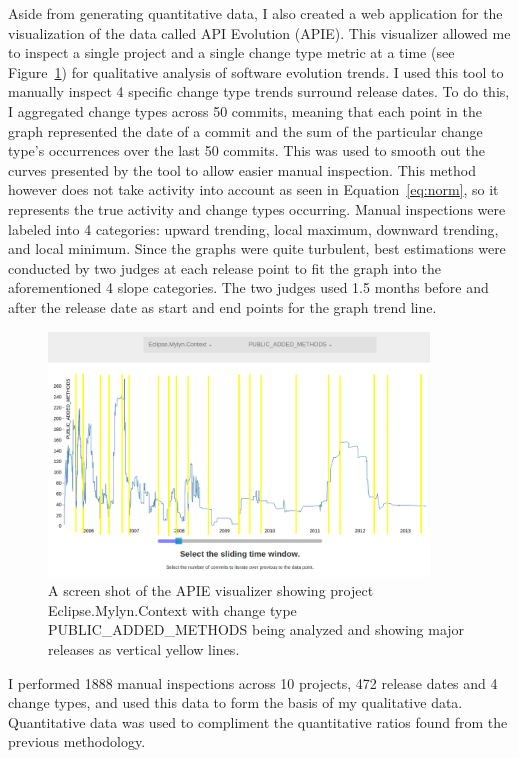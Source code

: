 Aside from generating quantitative data, I also created a web application for the visualization of the data called API Evolution (APIE). This visualizer allowed
me to inspect a single project and a single change type metric at a time (see Figure~\ref{fig:apie}) for qualitative analysis of software evolution trends. I
used this tool to manually inspect 4 specific change type trends surround release dates. To do this, I aggregated change types across 50 commits, meaning that
each point in the graph represented the date of a commit and the sum of the particular change type's occurrences over the last 50 commits. This was used to smooth
out the curves presented by the tool to allow easier manual inspection. This method however does not take activity into account as seen in
Equation~\ref{eq:norm}, so it represents the true activity and change types occurring. Manual inspections were labeled into 4 categories: upward trending, local maximum, downward
trending, and local minimum. Since the graphs were quite turbulent, best estimations were conducted by two judges at each release point to fit the graph into the aforementioned
4 slope categories. The two judges used 1.5 months before and after the release date as start and end points for the graph trend line.

\begin{figure}[tb!]
\centering
\includegraphics[width=0.9\textwidth]{figures/APIE.png}
\caption{A screen shot of the APIE visualizer showing project Eclipse.Mylyn.Context with change type PUBLIC\_ADDED\_METHODS being analyzed and showing
major releases as vertical yellow lines.\label{fig:apie}}
\end{figure}

I performed 1888 manual inspections across 10 projects, 472 release dates and 4 change types, and used this data to form the basis of my qualitative data.
Quantitative data was used to compliment the quantitative ratios found from the previous methodology. 


